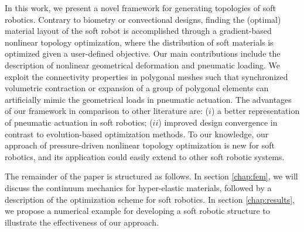 In this work, we present a novel framework for generating topologies of soft robotics. Contrary to biometry or convectional designs, finding the (optimal) material layout of the soft robot is accomplished through a gradient-based nonlinear topology optimization, where the distribution of soft materials is optimized given a user-defined objective. Our main contributions include the description of nonlinear geometrical deformation and pneumatic loading. We exploit the connectivity properties in polygonal meshes such that synchronized volumetric contraction or expansion of a group of polygonal elements can artificially mimic the geometrical loads in pneumatic actuation. The advantages of our framework in comparison to other literature are: ($i$) a better representation of pneumatic actuation in soft robotics; ($ii$) improved design convergence in contrast to evolution-based optimization methods. To our knowledge, our approach of pressure-driven nonlinear topology optimization is new for soft robotics, and its application could easily extend to other soft robotic systems. %

The remainder of the paper is structured as follows. In section \ref{chap:fem}, we will discuss the continuum mechanics for hyper-elastic materials, followed by a description of the optimization scheme for soft robotics. In section \ref{chap:results}, we propose a numerical example for developing a soft robotic structure to illustrate the effectiveness of our approach.
